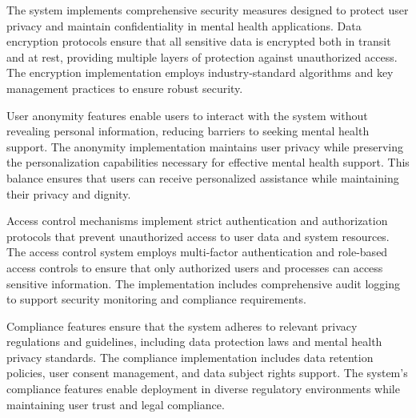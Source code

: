 The system implements comprehensive security measures designed to protect user privacy and maintain confidentiality in mental health applications. Data encryption protocols ensure that all sensitive data is encrypted both in transit and at rest, providing multiple layers of protection against unauthorized access. The encryption implementation employs industry-standard algorithms and key management practices to ensure robust security.

User anonymity features enable users to interact with the system without revealing personal information, reducing barriers to seeking mental health support. The anonymity implementation maintains user privacy while preserving the personalization capabilities necessary for effective mental health support. This balance ensures that users can receive personalized assistance while maintaining their privacy and dignity.

Access control mechanisms implement strict authentication and authorization protocols that prevent unauthorized access to user data and system resources. The access control system employs multi-factor authentication and role-based access controls to ensure that only authorized users and processes can access sensitive information. The implementation includes comprehensive audit logging to support security monitoring and compliance requirements.

Compliance features ensure that the system adheres to relevant privacy regulations and guidelines, including data protection laws and mental health privacy standards. The compliance implementation includes data retention policies, user consent management, and data subject rights support. The system's compliance features enable deployment in diverse regulatory environments while maintaining user trust and legal compliance. 